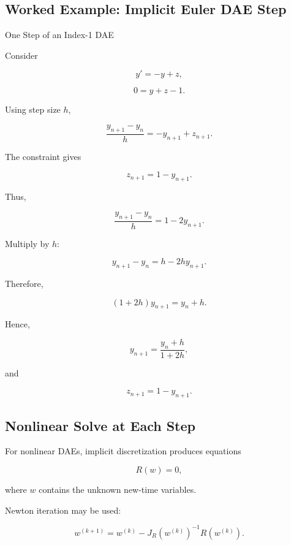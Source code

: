 \subsection{Worked Example: Implicit Euler DAE Step}
\label{subsec:worked-implicit-euler-dae}

\begin{workedexamplebox}{One Step of an Index-1 DAE}

Consider

\[
y'=-y+z,
\]

\[
0=y+z-1.
\]

Using step size \(h\),

\[
\frac{
y_{n+1}-y_n
}{
h
}
=
-y_{n+1}+z_{n+1}.
\]

The constraint gives

\[
z_{n+1}=1-y_{n+1}.
\]

Thus,

\[
\frac{
y_{n+1}-y_n
}{
h
}
=
1-2y_{n+1}.
\]

Multiply by \(h\):

\[
y_{n+1}-y_n
=
h-2hy_{n+1}.
\]

Therefore,

\[
(1+2h)y_{n+1}
=
y_n+h.
\]

Hence,

\begin{answerbox}
\[
\boxed{
y_{n+1}
=
\frac{
y_n+h
}{
1+2h
},
}
\]

and

\[
\boxed{
z_{n+1}
=
1-y_{n+1}.
}
\]
\end{answerbox}

\end{workedexamplebox}

\subsection{Nonlinear Solve at Each Step}
\label{subsec:dae-nonlinear-solve}

For nonlinear DAEs, implicit discretization produces equations

\[
\boxed{
R(w)=0,
}
\]

where \(w\) contains the unknown new-time variables.

Newton iteration may be used:

\[
\boxed{
w^{(k+1)}
=
w^{(k)}
-
J_R(w^{(k)})^{-1}
R(w^{(k)}).
}
\]


